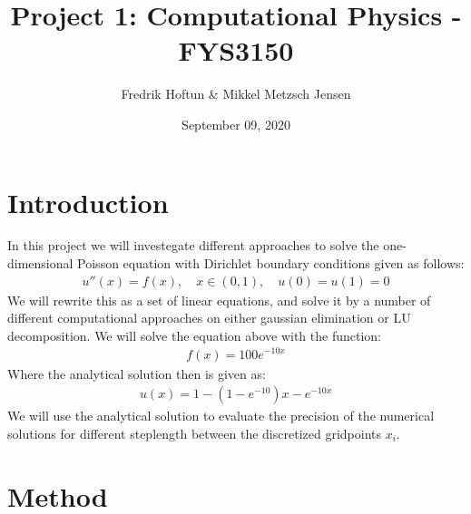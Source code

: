\documentclass[american,a4paper,12pt]{article}
\title{Project 1: Computational Physics - FYS3150}
\author{Fredrik Hoftun \& Mikkel Metzsch Jensen}
\date{September 09, 2020}
\begin{document}
\maketitle

\section{Introduction}
  In this project we will investegate different approaches to solve the one-dimensional Poisson equation with Dirichlet boundary conditions given as follows:
  \begin{align*}
    u''(x) = f(x), \quad x \in (0,1), \quad u(0) = u(1) = 0
  \end{align*}
  We will rewrite this as a set of linear equations, and solve it by a number of different computational approaches on either gaussian elimination or LU decomposition. We will solve the equation above with the function:
  \begin{align*}
    f(x) = 100e^{-10x}
  \end{align*}
  Where the analytical solution then is given as:
  \begin{align*}
    u(x) = 1 - (1 - e^{-10})x - e^{-10x}
  \end{align*}
  We will use the analytical solution to evaluate the precision of the numerical solutions for different steplength between the discretized gridpoints $x_i$.
\section{Method}
\end{document}
